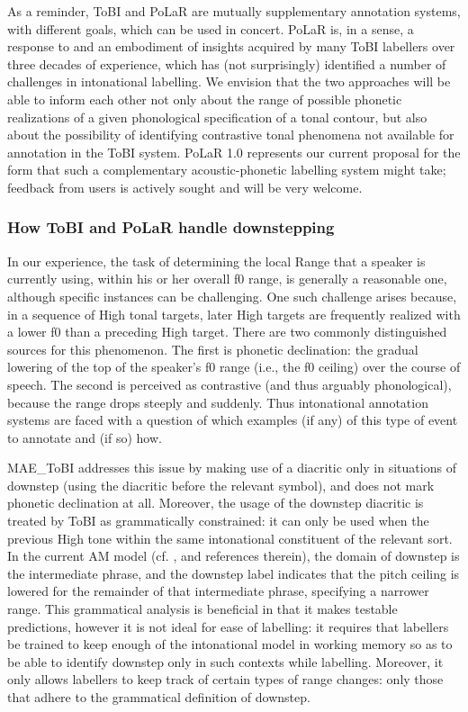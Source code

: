 \documentclass[11pt, twoside]{memoir}
\def\textlabel#1{{\relsize{-.5}\fontspec[Mapping=tex-text]{Roboto Mono}{#1}}}
\begin{document}
As a reminder, ToBI and PoLaR are mutually supplementary annotation systems, with different goals, which can be used in concert.  PoLaR is, in a sense, a response to and an embodiment of insights acquired by many ToBI labellers over three decades of experience, which has (not surprisingly) identified a number of challenges in intonational labelling. We envision that the two approaches will be able to inform each other not only about the range of possible phonetic realizations of a given phonological specification of a tonal contour, but also about the possibility of identifying contrastive tonal phenomena not available for annotation in the ToBI system. PoLaR 1.0 represents our current proposal for the form that such a complementary acoustic-phonetic labelling system might take; feedback from users is actively sought and will be very welcome.

\subsubsection{How ToBI and PoLaR handle downstepping}\label{sec:downstepping-am-models-and-tobi-annotation}
In our experience, the task of determining the local Range that a speaker is currently using, within his or her overall f0 range, is generally a reasonable one, although specific instances can be challenging. One such challenge arises because, in a sequence of High tonal targets, later High targets are frequently realized with a lower f0 than a preceding High target. There are two commonly distinguished sources for this phenomenon. The first is phonetic declination: the gradual lowering of the top of the speaker’s f0 range (i.e., the f0 ceiling) over the course of speech. The second is perceived as contrastive (and thus arguably phonological), because the range drops steeply and suddenly. Thus intonational annotation systems are faced with a question of which examples (if any) of this type of event to annotate and (if so) how.

MAE\_ToBI addresses this issue by making use of a diacritic only in situations of downstep (using the \textlabel{!} diacritic before the relevant \textlabel{H} symbol), and does not mark phonetic declination at all. Moreover, the usage of the downstep diacritic is treated by ToBI as grammatically constrained: it can only be used when the previous High tone within the same intonational constituent of the relevant sort. In the current AM model (cf. \citealt[17–18]{beckman-05}, and references therein), the domain of downstep is the intermediate phrase, and the downstep label indicates that the pitch ceiling is lowered for the remainder of that intermediate phrase, specifying a narrower range. This grammatical analysis is beneficial in that it makes testable predictions, however it is not ideal for ease of labelling: it requires that labellers be trained to keep enough of the intonational model in working memory so as to be able to identify downstep only in such contexts while labelling. Moreover, it only allows labellers to keep track of certain types of range changes: only those that adhere to the grammatical definition of downstep.
\end{document}
